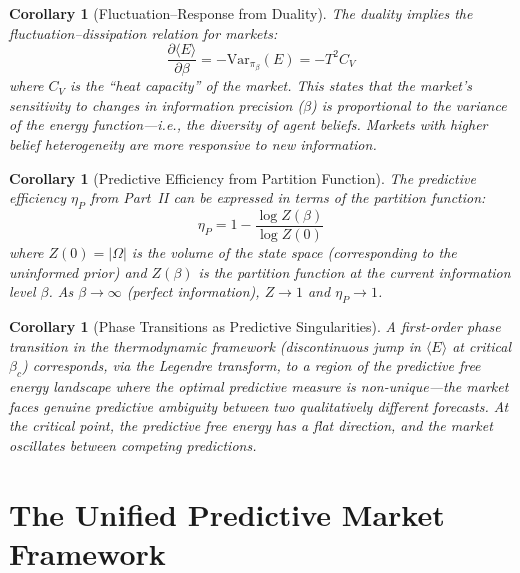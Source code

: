 \documentclass[12pt,a4paper]{article}
\newtheorem{corollary}[theorem]{Corollary}
\theoremstyle{definition}
\newcommand{\Var}{\mathrm{Var}}
\begin{document}
\begin{corollary}[Fluctuation--Response from Duality]\label{cor:fluct_response}
The duality implies the fluctuation--dissipation relation for markets:
\begin{equation}\label{eq:fluct_dissipation}
    \frac{\partial \langle E \rangle}{\partial \beta} = -\Var_{\pi_\beta}(E) = -T^2 C_V
\end{equation}
where $C_V$ is the ``heat capacity'' of the market. This states that the market's sensitivity to changes in information precision ($\beta$) is proportional to the variance of the energy function---i.e., the diversity of agent beliefs. Markets with higher belief heterogeneity are more responsive to new information.
\end{corollary}

\begin{corollary}[Predictive Efficiency from Partition Function]\label{cor:pred_eff}
The predictive efficiency $\eta_P$ from Part~II can be expressed in terms of the partition function:
\begin{equation}
    \eta_P = 1 - \frac{\log Z(\beta)}{\log Z(0)}
\end{equation}
where $Z(0) = |\Omega|$ is the volume of the state space (corresponding to the uninformed prior) and $Z(\beta)$ is the partition function at the current information level $\beta$. As $\beta \to \infty$ (perfect information), $Z \to 1$ and $\eta_P \to 1$.
\end{corollary}

\begin{corollary}[Phase Transitions as Predictive Singularities]\label{cor:phase_pred}
A first-order phase transition in the thermodynamic framework (discontinuous jump in $\langle E \rangle$ at critical $\beta_c$) corresponds, via the Legendre transform, to a region of the predictive free energy landscape where the optimal predictive measure is non-unique---the market faces genuine predictive ambiguity between two qualitatively different forecasts. At the critical point, the predictive free energy has a flat direction, and the market oscillates between competing predictions.
\end{corollary}



\section{The Unified Predictive Market Framework}\label{sec:unified}
\end{document}
